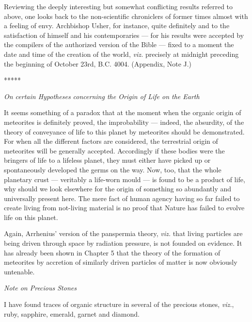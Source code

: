 \documentclass[a4paper, 12pt, oneside, landscape]{article}
\begin{document}
Reviewing the deeply interesting but somewhat conflicting results referred to above, one looks back to the non-scientific chroniclers of former times almost with a feeling of envy. Archbishop Usher, for instance, quite definitely and to the satisfaction of himself and his contemporaries --- for his results were accepted by the compilers of the authorized version of the Bible --- fixed to a moment the date and time of the creation of the world, \emph{viz.} precisely at midnight preceding the beginning of October 23rd, B.C. 4004. (Appendix, Note J.)

\centerline{*\hspace{15mm}*\hspace{15mm}*\hspace{15mm}*\hspace{15mm}*}
\bigskip

\centerline{\emph{On certain Hypotheses concerning the Origin of Life on the Earth}}

It seems something of a paradox that at the moment when the organic origin of meteorites is definitely proved, the improbability --- indeed, the absurdity, of the theory of conveyance of life to this planet by meteorites should be demonstrated. For when all the different factors are considered, the terrestrial origin of meteorites will be generally accepted. Accordingly if these bodies were the bringers of life to a lifeless planet, they must either have picked up or spontaneously developed the germs on the way. Now, too, that the whole planetary crust --- veritably a life-worn mould --- is found to be a product of life, why should we look elsewhere for the origin of something so abundantly and universally present here. The mere fact of human agency having so far failed to create living from not-living material is no proof that Nature has failed to evolve life on this planet.

Again, Arrhenius' version of the panspermia theory, \emph{viz.} that living particles are being driven through space by radiation pressure, is not founded on evidence. It has already been shown in Chapter 5 that the theory of the formation of meteorites by accretion of similarly driven particles of matter is now obviously untenable.

\centerline{\emph{Note on Precious Stones}}

I have found traces of organic structure in several of the precious stones, \emph{viz.}, ruby, sapphire, emerald, garnet and diamond.
\end{document}

